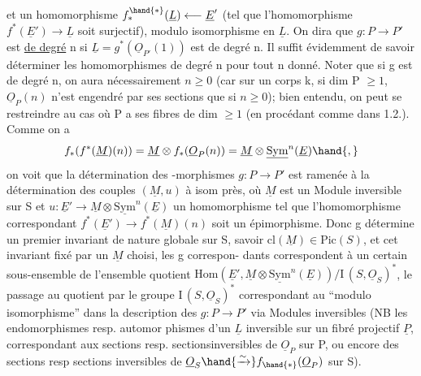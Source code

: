 
et  un homomorphisme  $f^{\hand{*}}_{*}(\underline{L}) \longleftarrow \underline{E}'$  (tel que l'homomorphisme 
$f^{*}(\underline{E}') \to \underline{L}$  soit surjectif), modulo  isomorphisme en $\underline{L}$.  On dira que
$g\colon P \to P'$  est \uline{de degré} n si $\underline{L} = g^{*}(\underline{O}_{P'}(1))$  est de degré n. Il suffit
évidemment de savoir déterminer les homomorphismes de degré n pour tout n
donné.  Noter que si g est de degré n, on aura nécessairement $n \geq 0$
(car  sur un corps k,  si dim P $\geq 1$, $\underline{O}_P(n)$ n'est engendré par ses
sections que si $n \geq 0$); bien entendu, on peut  se restreindre au cas
où P a ses fibres de dim $\geq 1$ (en procédant comme dans 1.2.).  Comme on a
\[ f_{*}(f^{*}(\underline{M})(n)) = \underline{M} \otimes f_{*}(\underline{O}_P(n)) = \underline{M} \otimes \underline{\mathrm{Sym}}^{n}(\underline{E}) \hand{,} \]
on voit que la détermination des -morphismes  $g\colon P \to P'$  est ramenée
à la détermination des couples $(\underline{M},u)$ à isom près, où $\underline{M}$  est un Module
inversible sur S et  $u\colon \underline{E}' \to \underline{M}\otimes\underline{\mathrm{Sym}}^{n}(\underline{E})$  un homomorphisme  tel que
l'homomorphisme correspondant  $f^{*}(\underline{E}') \to f^{*}(\underline{M})(n)$  soit un épimorphisme.
Donc  g détermine un premier invariant de nature globale sur S, savoir
$\mathrm{cl}(\underline{M}) \in \mathrm{Pic}(S)$, et cet invariant fixé par un $\underline{M}$ choisi,  les g correspon-%
dants correspondent à un certain sous-ensemble de l'ensemble quotient
$\mathrm{Hom}(\underline{E}',\underline{M}\otimes\underline{\mathrm{Sym}}^{n}(\underline{E}))/\mathrm{I}\,(S,\underline{O}_S)^{*}$,  le passage au quotient par le groupe
$\mathrm{I}\,(S,\underline{O}_S)^{*}$ correspondant  au  ``modulo isomorphisme'' dans la description
des $g\colon P \to P'$ via Modules inversibles  (NB  les endomorphismes resp. automor
phismes d'un $\underline{L}$ inversible sur un fibré projectif $\underline{P}$, correspondant aux
sections resp. sections\hand{$|$}inversibles de $\underline{O}_P$ sur P,  ou encore des sections
resp sections inversibles de $\underline{O}_S \hand{\xrightarrow{\sim}} f_{\hand{*}}(\underline{O}_P)$ sur S).

